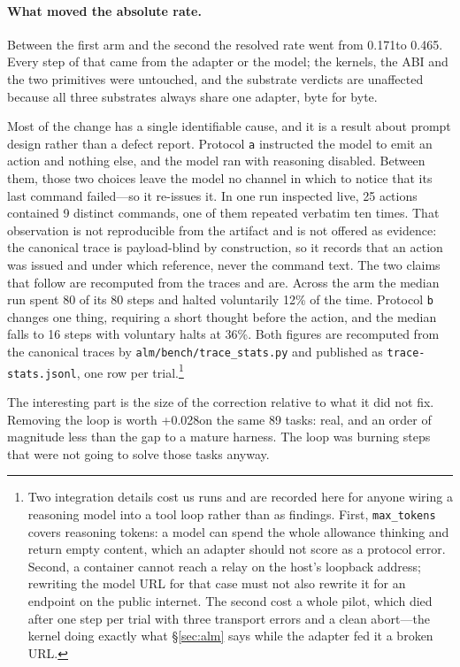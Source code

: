 \documentclass[11pt,a4paper]{article}
\begin{document}
\paragraph{What moved the absolute rate.}
Between the first arm and the second the resolved rate went from 0.171to
0.465. Every step of that came from the adapter or the model; the kernels,
the ABI and the two primitives were untouched, and the substrate verdicts are
unaffected because all three substrates always share one adapter, byte for
byte.

Most of the change has a single identifiable cause, and it is a result about
prompt design rather than a defect report. Protocol \texttt{a} instructed the
model to emit an action and nothing else, and the model ran with reasoning
disabled. Between them, those two choices leave the model no channel in which
to notice that its last command failed---so it re-issues it. In one run inspected live, 25 actions contained 9 distinct commands, one
of them repeated verbatim ten times. That observation is not reproducible
from the artifact and is not offered as evidence: the canonical trace is
payload-blind by construction, so it records that an action was issued and
under which reference, never the command text. The two claims that follow
are recomputed from the traces and are. Across the arm the median run spent 80 of its 80 steps and halted
voluntarily 12\% of the time. Protocol \texttt{b} changes one thing, requiring
a short thought before the action, and the median falls to 16 steps with
voluntary halts at 36\%. Both figures are recomputed from the canonical
traces by \texttt{alm/bench/trace\_stats.py} and published as
\texttt{trace-stats.jsonl}, one row per trial.\footnote{Two integration details cost us runs and are
recorded here for anyone wiring a reasoning model into a tool loop rather than
as findings. First, \texttt{max\_tokens} covers reasoning tokens: a model can
spend the whole allowance thinking and return empty content, which an adapter
should not score as a protocol error. Second, a container cannot reach a relay
on the host's loopback address; rewriting the model URL for that case must not
also rewrite it for an endpoint on the public internet. The second cost a whole
pilot, which died after one step per trial with three transport errors and a
clean abort---the kernel doing exactly what \S\ref{sec:alm} says while the
adapter fed it a broken URL.}

The interesting part is the size of the correction relative to what it did not
fix. Removing the loop is worth +0.028on the same 89 tasks: real, and
an order of magnitude less than the gap to a mature harness. The loop was
burning steps that were not going to solve those tasks anyway.
\end{document}
